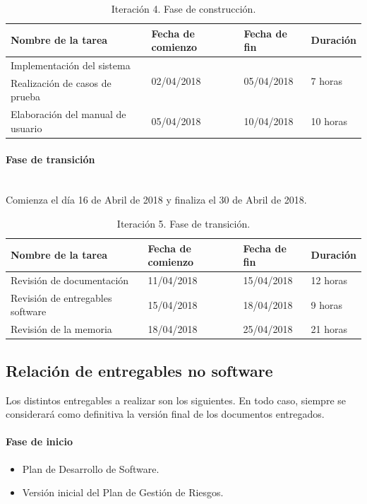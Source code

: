 \documentclass[twoside]{report}
\begin{document}
\begin{table}[H]
\centering
\begin{tabular}{|l|l|l|l|}
\hline
Nombre de la tarea                & Fecha de comienzo & Fecha de fin & Duración \\ \hline
Implementación del sistema        & \multirow{2}{*}{02/04/2018} & \multirow{2}{*}{05/04/2018}   & \multirow{2}{*}{7 horas}  \\
Realización de casos de prueba    & &   &   \\ \hline
Elaboración del manual de usuario & 05/04/2018        & 10/04/2018   & 10 horas   \\ \hline

\end{tabular}
\caption{Iteración 4. Fase de construcción.}
\end{table}

\paragraph{Fase de transición}\mbox{}\\

Comienza el día 16 de Abril de 2018 y finaliza el 30 de Abril de 2018.

\begin{table}[H]
\centering
\begin{tabular}{|l|l|l|l|}
\hline
Nombre de la tarea              & Fecha de comienzo & Fecha de fin & Duración \\ \hline
Revisión de documentación       & 11/04/2018        & 15/04/2018   & 12 horas   \\ \hline
Revisión de entregables software & 15/04/2018        & 18/04/2018   & 9 horas   \\ \hline
Revisión de la memoria & 18/04/2018        & 25/04/2018   & 21 horas   \\ \hline
\end{tabular}
\caption{Iteración 5. Fase de transición.}
\end{table}

\subsection{Relación de entregables no software}

Los distintos entregables a realizar son los siguientes. En todo caso, siempre se considerará como definitiva la versión final de los documentos entregados.
\paragraph{Fase de inicio\\}
\begin{itemize}
\item Plan de Desarrollo de Software.
\item Versión inicial del Plan de Gestión de Riesgos.
\end{itemize}
\end{document}

